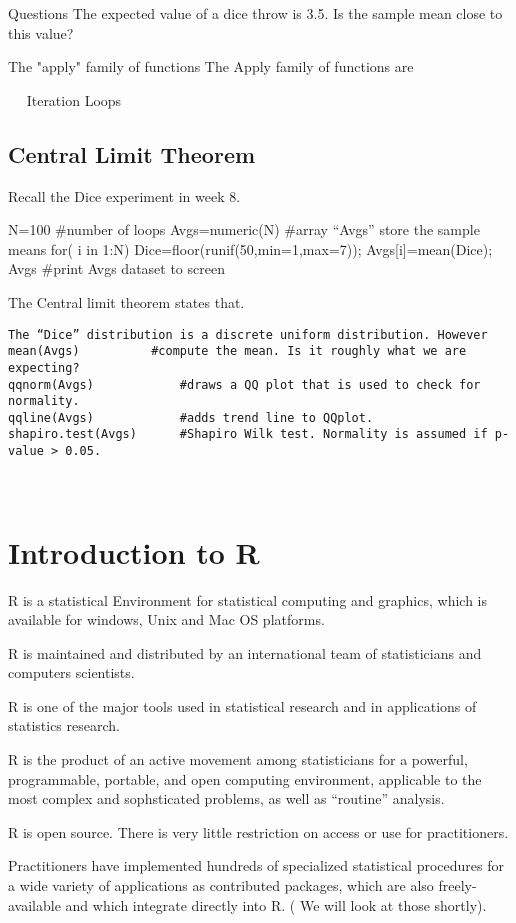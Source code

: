 Questions
The expected value of a dice throw is 3.5. Is the sample mean close to this value?

The "apply" family of functions
 The Apply family of functions are 


 
Iteration Loops
\subsection*{Central Limit Theorem}
Recall the Dice experiment in week 8.

N=100				#number of loops
Avgs=numeric(N)		#array “Avgs” store the sample means
for( i in 1:N)
	{	Dice=floor(runif(50,min=1,max=7));	Avgs[i]=mean(Dice);
	}
Avgs				#print Avgs dataset to screen

The Central limit theorem states that.
\begin{verbatim}
The “Dice” distribution is a discrete uniform distribution. However 
mean(Avgs)			#compute the mean. Is it roughly what we are expecting?
qqnorm(Avgs)			#draws a QQ plot that is used to check for normality.
qqline(Avgs)			#adds trend line to QQplot.
shapiro.test(Avgs)		#Shapiro Wilk test. Normality is assumed if p-value > 0.05.
\end{verbatim}
			
 \newpage
\section*{Introduction to R}


R is a statistical Environment for statistical computing and graphics, which is available for windows, Unix and Mac OS platforms.

R is maintained and distributed by an international team of statisticians and computers scientists.

R is one of the major tools used in statistical research and in applications of statistics research.

R is the product of an active movement among statisticians for a powerful, programmable, portable, and open computing environment, applicable to the most complex and sophsticated problems, as well as “routine” analysis.

R is open source. There is very little restriction on access or use for practitioners.

Practitioners have implemented hundreds of specialized statistical procedures for a wide variety of applications as contributed packages, which are also freely-available and which integrate directly into R. ( We will look at those shortly).

